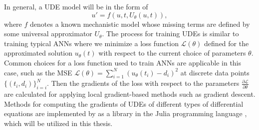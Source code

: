 In general, a \gls{UDE} model will be in the form of
\begin{equation*}
    u' = f(u, t, U_\theta(u, t)),
\end{equation*}
where $f$ denotes a known mechanistic model whose missing terms are defined by some universal approximator $U_\theta$.
The process for training \glspl{UDE} is similar to training typical \glspl{ANN} where we minimize a loss function $\mathcal{L}(\theta)$ defined for the approximated solution $u_\theta(t)$ with respect to the current choice of parameters $\theta$.
Common choices for a loss function used to train \glspl{ANN} are applicable in this case, such as the \gls{MSE} $\mathcal{L}(\theta) = \sum_{i=1}^{N} (u_\theta(t_i) - d_i)^2$ at discrete data points $\{(t_i, d_i)\}_{i=i}^N$.
Then the gradients of the loss with respect to the parameters $\frac{\partial\mathcal{L}}{\partial\theta}$ are calculated for applying local gradient-based methods such as gradient descent.
Methods for computing the gradients of \glspl{UDE} of different types of differential equations are implemented by \citeauthor{rackauckasUniversalDifferentialEquations2020} \cite{rackauckasUniversalDifferentialEquations2020} as a library in the Julia programming language \cite{bezanson2012julia}, which will be utilized in this thesis.